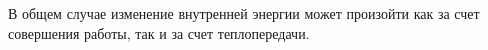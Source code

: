 \documentclass[main.tex]{subfiles}
\begin{document}
В общем случае изменение внутренней энергии может произойти как за счет совершения работы, так и за счет теплопередачи.















































 
\end{document}
